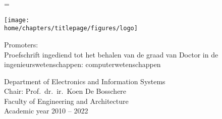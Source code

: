 \documentclass[\home/main.tex]{subfiles}
\begin{document}
\begin{titlepage}

\emergencystretch=\maxdimen
{}

\phdsansfont

   \vspace*{0.1\paperheight}
   
   \begin{flushright}
   	 \huge\thetitle
   	 
   	 \vspace*{0.75cm}
   	 
   	 \huge\thetitleNL
   	 
   	 \vspace*{1.5cm}
   	 
   	 \Large\theauthor
   \end{flushright}

   \vfill
   	
	\begin{minipage}[b]{0.15\linewidth}
		\texttt{[image: \\home/chapters/titlepage/figures/logo]}
	\end{minipage}%
	\begin{minipage}[b]{0.85\linewidth}%
		\begin{flushright}
		Promoters: \thepromotors\\
		Proefschrift ingediend tot het behalen van de graad van Doctor in de ingenieurswetenschappen: computerwetenschappen
		
		
		\vspace*{1em}
		
		Department of Electronics and Information Systems\\
		Chair: Prof.\ dr.\ ir.\ Koen De Bosschere\\
		Faculty of Engineering and Architecture \\ 
		Academic year 2010 -- 2022
		\end{flushright}%
	\end{minipage}%
\end{titlepage}
\end{document}
